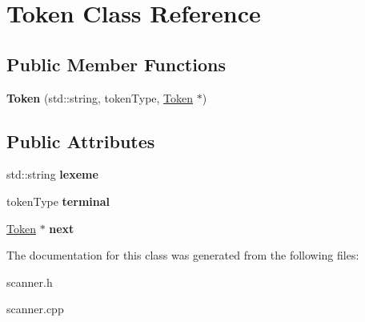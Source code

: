 \hypertarget{class_token}{}\section{Token Class Reference}
\label{class_token}
\subsection*{Public Member Functions}
\begin{DoxyCompactItemize}
\item 
\hypertarget{class_token_a93748eebdfd09607d5170458c759d802}{}{\bfseries Token} (std\+::string, token\+Type, \hyperlink{class_token}{Token} $\ast$)\label{class_token_a93748eebdfd09607d5170458c759d802}

\end{DoxyCompactItemize}
\subsection*{Public Attributes}
\begin{DoxyCompactItemize}
\item 
\hypertarget{class_token_a1faf28f0fce064a0f34c7070ccd446a8}{}std\+::string {\bfseries lexeme}\label{class_token_a1faf28f0fce064a0f34c7070ccd446a8}

\item 
\hypertarget{class_token_a11b4722b5e4023d234d2017126de378b}{}token\+Type {\bfseries terminal}\label{class_token_a11b4722b5e4023d234d2017126de378b}

\item 
\hypertarget{class_token_a32f24a25af788c192e5b387dc8d67914}{}\hyperlink{class_token}{Token} $\ast$ {\bfseries next}\label{class_token_a32f24a25af788c192e5b387dc8d67914}

\end{DoxyCompactItemize}


The documentation for this class was generated from the following files\+:\begin{DoxyCompactItemize}
\item 
scanner.\+h\item 
scanner.\+cpp\end{DoxyCompactItemize}
